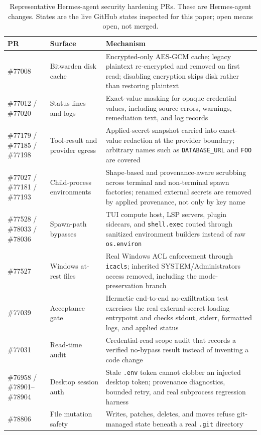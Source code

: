\documentclass[11pt]{article}
\theoremstyle{definition}
\theoremstyle{plain}
\theoremstyle{remark}
\begin{document}
\begin{table}[H]
\centering
\caption{Representative Hermes-agent security hardening PRs. These are
Hermes-agent changes. States are the live GitHub states inspected for this
paper; open means open, not merged.}
\label{tab:hermes-security-prs}
\begin{tabular}{@{}p{}p{}p{}@{}}
\toprule
PR & Surface & Mechanism \\
\midrule
\#77008 & Bitwarden disk cache & Encrypted-only AES-GCM cache; legacy plaintext re-encrypted and removed on first read; disabling encryption skips disk rather than restoring plaintext \\
\#77012 / \#77020 & Status lines and logs & Exact-value masking for opaque credential values, including source errors, warnings, remediation text, and log records \\
\#77179 / \#77185 / \#77198 & Tool-result and provider egress & Applied-secret snapshot carried into exact-value redaction at the provider boundary; arbitrary names such as \texttt{DATABASE\_URL} and \texttt{FOO} are covered \\
\#77027 / \#77181 / \#77193 & Child-process environments & Shape-based and provenance-aware scrubbing across terminal and non-terminal spawn factories; renamed external secrets are removed by applied provenance, not only by key name \\
\#77528 / \#78033 / \#78036 & Spawn-path bypasses & TUI compute host, LSP servers, plugin sidecars, and \texttt{shell.exec} routed through sanitized environment builders instead of raw \texttt{os.environ} \\
\#77527 & Windows at-rest files & Real Windows ACL enforcement through \texttt{icacls}; inherited SYSTEM/Administrators access removed, including the mode-preservation branch \\
\#77039 & Acceptance gate & Hermetic end-to-end no-exfiltration test exercises the real external-secret loading entrypoint and checks stdout, stderr, formatted logs, and applied status \\
\#77031 & Read-time audit & Credential-read scope audit that records a verified no-bypass result instead of inventing a code change \\
\#76958 / \#78901--\#78904 & Desktop session auth & Stale \texttt{.env} token cannot clobber an injected desktop token; provenance diagnostics, bounded retry, and real subprocess regression harness \\
\#78806 & File mutation safety & Writes, patches, deletes, and moves refuse git-managed state beneath a real \texttt{.git} directory \\
\bottomrule
\end{tabular}
\end{table}
\end{document}
